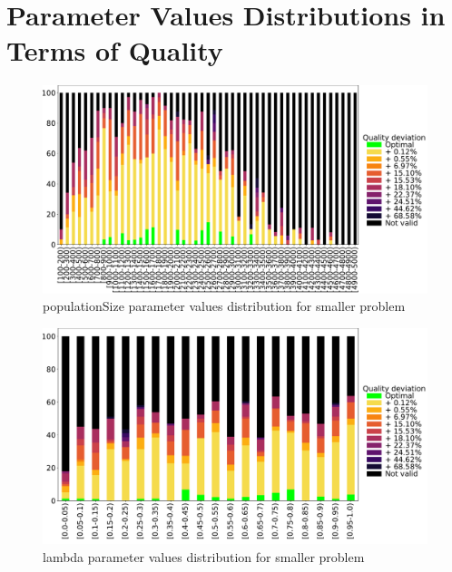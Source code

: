 \chapter{Parameter Values Distributions in Terms of Quality}\label{appendix:Distributions3}

\begin{figure}
	\centering
	\includegraphics[width=\textwidth]{images/DistrObj/populationSize.pdf}
	\caption[populationSize parameter values distribution for smaller problem]{populationSize parameter values distribution for smaller problem}
	\label{fig:populationSize_Obj}
\end{figure}

\begin{figure}
	\centering
	\includegraphics[width=\textwidth]{images/DistrObj/lambda.pdf}
	\caption[lambda parameter values distribution for smaller problem]{lambda parameter values distribution for smaller problem}
	\label{fig:lambda_Obj}
\end{figure}

